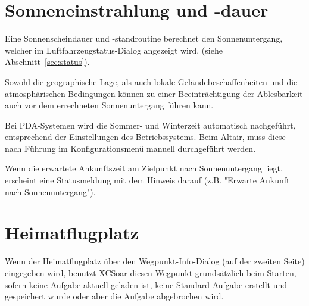 \section{Sonneneinstrahlung und -dauer}

Eine Sonnenscheindauer und -standroutine berechnet den Sonnenuntergang, welcher im Luftfahrzeugstatus-Dialog angezeigt wird. (siehe Abschnitt~\ref{sec:status}).

 Sowohl die geographische Lage, als auch  lokale Geländebeschaffenheiten und die atmosphärischen Bedingungen können zu einer Beeinträchtigung der Ablesbarkeit auch vor dem errechneten Sonnenuntergang führen kann.  

Bei PDA-Systemen wird die Sommer- und Winterzeit automatisch nachgeführt, entsprechend der Einstellungen des Betriebssystems. Beim Altair, muss diese nach Führung im Konfigurationsmenü manuell durchgeführt werden.

Wenn die erwartete Ankunftszeit am Zielpunkt nach Sonnenuntergang liegt, erscheint eine Statusmeldung mit dem Hinweis darauf (z.B. "Erwarte Ankunft nach Sonnenuntergang").

\section{\textcolor[rgb]{1.00,0.00,0.00}{Heimatflugplatz}}
Wenn der Heimatflugplatz über den Wegpunkt-Info-Dialog (auf der zweiten Seite) eingegeben wird, benutzt \textsf{XCSoar} diesen Wegpunkt grundsätzlich beim Starten, sofern keine Aufgabe aktuell geladen ist, keine Standard Aufgabe erstellt und gespeichert wurde oder aber die Aufgabe abgebrochen wird. 
